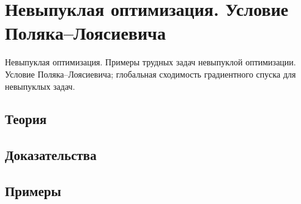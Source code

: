 
\section{Невыпуклая оптимизация. Условие Поляка–Лоясиевича}
\label{sec:2.4.12-nonconvex-optimization}

\begin{ticket}
Невыпуклая оптимизация. Примеры трудных задач невыпуклой оптимизации. Условие Поляка–Лоясиевича; глобальная сходимость градиентного спуска для невыпуклых задач.
\end{ticket}

\subsection*{Теория}

\subsection*{Доказательства}

\subsection*{Примеры}
